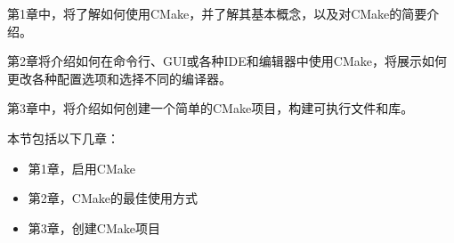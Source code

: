 
第1章中，将了解如何使用CMake，并了解其基本概念，以及对CMake的简要介绍。

第2章将介绍如何在命令行、GUI或各种IDE和编辑器中使用CMake，将展示如何更改各种配置选项和选择不同的编译器。

第3章中，将介绍如何创建一个简单的CMake项目，构建可执行文件和库。

本节包括以下几章：

\begin{itemize}
\item 第1章，启用CMake
\item 第2章，CMake的最佳使用方式
\item 第3章，创建CMake项目
\end{itemize}